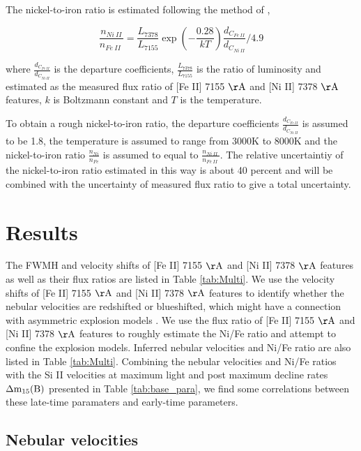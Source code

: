 \documentclass[twocolumn]{aastex631}
\begin{document}
The nickel-to-iron ratio is estimated following the method of \citet{2018MNRAS.477.3567M},

\begin{equation}
\frac{n_{Ni\ II}}{n_{Fe\ II}\ }=\frac{L_{7378}}{L_{7155}}\exp{\left(-\frac{0.28}{kT}\right)}\frac{d_{C_{Fe\ II}}}{d_{C_{Ni\ II}}}/4.9
\end{equation}

where $\frac{d_{C_{Fe\ II}}}{d_{C_{Ni\ II}}}$ is the departure coefficients, $\frac{L_{7378}}{L_{7155}}$ is the ratio of luminosity and estimated as the measured flux ratio of [Fe II] 7155 $\rm \AA$ and [Ni II] 7378 $\rm \AA$ features, $k$ is Boltzmann constant and $T$ is the temperature. 

To obtain a rough nickel-to-iron ratio, the departure coefficients $\frac{d_{C_{Fe\ II}}}{d_{C_{Ni\ II}}}$ is assumed to be 1.8, the temperature is assumed to range from 3000K to 8000K and the nickel-to-iron ratio $\frac{n_{Ni}}{n_{Fe}}$ is assumed to equal to $\frac{n_{Ni\ II}\ }{n_{Fe\ II}\ }$. The relative uncertaintiy of the nickel-to-iron ratio estimated in this way is about 40 percent and will be combined with the uncertainty of measured flux ratio to give a total uncertainty.    

\section{Results} \label{sec:results}

The FWMH and velocity shifts of [Fe II] 7155 $\rm \AA$ and [Ni II] 7378 $\rm \AA$ features as well as their flux ratios are listed in Table \ref{tab:Multi}. We use the velocity shifts of [Fe II] 7155 $\rm \AA$ and [Ni II] 7378 $\rm \AA$ features to identify whether the nebular velocities are redshifted or blueshifted, which might have a connection with asymmetric explosion models \citep{2010Natur.466...82M}. We use the flux ratio of [Fe II] 7155 $\rm \AA$ and [Ni II] 7378 $\rm \AA$ features to roughly estimate the Ni/Fe ratio and attempt to confine the explosion models. Inferred nebular velocities and Ni/Fe ratio are also listed in Table \ref{tab:Multi}. Combining the nebular velocities and Ni/Fe ratios with the Si II velocities at maximum light and post maximum decline rates $\rm {\Delta}m_{15}(B)$ presented in Table \ref{tab:base_para}, we find some correlations between these late-time paramaters and early-time parameters.     

\subsection{Nebular velocities \label{subsec:N_v}}
\end{document}
